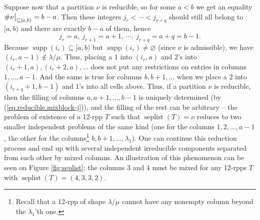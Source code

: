 \documentclass[numbers=enddot,12pt,final,onecolumn,notitlepage]{scrartcl}%
\theoremstyle{definition}
\def\seplist{{\operatorname{seplist}}} %
\def\seplistvar{{{\nu}}} %
\def\supp{{\operatorname{supp}}}
\def\lm{{\lambda/\mu}}
\begin{document}
Suppose now that a partition $\seplistvar$ is reducible, so for some $a<b$ we get an equality $\#\nuab=b-a$. Then these integers $j_r<\cdots<j_{r+q}$ should still all belong to $[a,b)$ and there are exactly $b-a$ of them, hence 
\begin{equation}
j_r=a,\ j_{r+1}=a+1,\ \cdots,\ j_{r+q}=a+q=b-1 .
\label{eq.reducible.mixblock-j}
\end{equation}
Because $\supp(i_r)\subseteq[a,b)$ but $\supp(i_r)\neq\varnothing$ (since $\nu$ is admissible), we have $(i_r,a-1)\notin\lm$. Thus, placing a $1$ into $(i_r,a)$ and $2$'s into $(i_r+1,a),(i_r+2,a),\dots$ does not put any restrictions on entries in columns $1,\dots, a-1$. And the same is true for columns $b,b+1,\dots$ when we place a $2$ into $(i_{r+q}+1,b-1)$ and $1$'s into all cells above. Thus, if a partition $\seplistvar$ is reducible, then the filling of columns $a,a+1,\dots, b-1$ is uniquely determined (by (\ref{eq.reducible.mixblock-j})), and the filling of the rest can be arbitrary -- the problem of existence of a 12-rpp $T$ such that $\seplist(T)=\seplistvar$ reduces to two smaller independent problems of the same kind (one for the columns $1,2,\ldots,a-1$, the other for the columns\footnote{Recall that a 12-rpp of shape $\lm$ cannot have any nonempty column beyond the $\lambda_1$'th one.} $b,b+1,\ldots,\lambda_1$). One can continue this reduction process and end up with several independent irreducible components separated from each other by mixed columns. An illustration of this phenomenon can be seen on Figure \ref{fig:seplist}: the columns $3$ and $4$ must be mixed for any 12-rpps $T$ with $\seplist(T)=(4,3,3,2)$.
\end{document}
